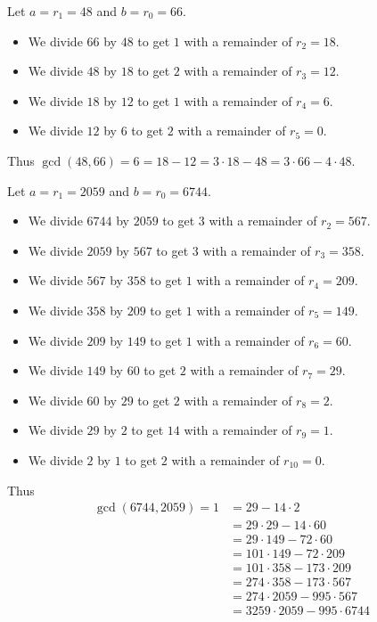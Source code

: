 \documentclass[11pt,dvipsnames]{book}
\numberwithin{equation}{section} %
\numberwithin{figure}{section} %
\numberwithin{table}{section} %
\begin{document}
\begin{example}
Let $a = r_1 = 48$ and $b = r_0 = 66$.
\begin{itemize}
    \item We divide $66$ by $48$ to get $1$ with a remainder of $r_2=18$.
    \item We divide $48$ by $18$ to get $2$ with a remainder of $r_3 = 12$.
    \item We divide $18$ by $12$ to get $1$ with a remainder of $r_4 = 6$.
    \item We divide $12$ by $6$ to get $2$ with a remainder of $r_5 = 0$.
\end{itemize}
Thus $\gcd(48,66) = 6 = 18-12 = 3\cdot 18-48 = 3\cdot 66 -4\cdot 48$.
\end{example}

\begin{example}
Let $a = r_1 = 2059$ and $b = r_0 = 6744$.
\begin{itemize}
    \item We divide $6744$ by $2059$ to get $3$ with a remainder of $r_2=567$.
    \item We divide $2059$ by $567$ to get $3$ with a remainder of $r_3 = 358$.
    \item We divide $567$ by $358$ to get $1$ with a remainder of $r_4 = 209$.
    \item We divide $358$ by $209$ to get $1$ with a remainder of $r_5 = 149$.
    \item We divide $209$ by $149$ to get $1$ with a remainder of $r_6 = 60$.
    \item We divide $149$ by $60$ to get $2$ with a remainder of $r_7 = 29$.
    \item We divide $60$ by $29$ to get $2$ with a remainder of $r_8 = 2$.
    \item We divide $29$ by $2$ to get $14$ with a remainder of $r_9 = 1$.
    \item We divide $2$ by $1$ to get $2$ with a remainder of $r_{10} = 0$.
\end{itemize}
Thus
\begin{align*}
    \gcd(6744, 2059) = 1 &= 29 - 14\cdot 2 \\
    &= 29\cdot 29 - 14 \cdot 60 \\
    &= 29\cdot 149-72\cdot 60 \\
    &= 101\cdot 149-72\cdot 209 \\
    &= 101\cdot 358-173\cdot 209 \\
    &= 274\cdot 358-173\cdot 567 \\
    &= 274\cdot 2059-995\cdot 567 \\
    &= 3259\cdot 2059-995\cdot 6744 \\
\end{align*}
\end{example}
\end{document}
